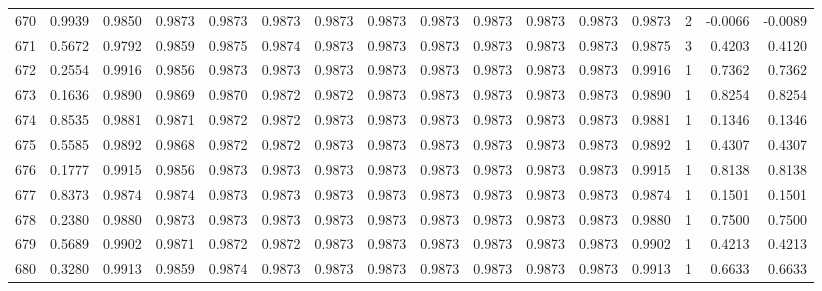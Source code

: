 \begin{tabular}{lrrrrrrrrrrrrrrr}
670 &      0.9939 &  0.9850 &  0.9873 &  0.9873 &  0.9873 &  0.9873 &  0.9873 &  0.9873 &  0.9873 &  0.9873 &   0.9873 &     0.9873 &      2 &                   -0.0066 &                    -0.0089 \\
671 &      0.5672 &  0.9792 &  0.9859 &  0.9875 &  0.9874 &  0.9873 &  0.9873 &  0.9873 &  0.9873 &  0.9873 &   0.9873 &     0.9875 &      3 &                    0.4203 &                     0.4120 \\
672 &      0.2554 &  0.9916 &  0.9856 &  0.9873 &  0.9873 &  0.9873 &  0.9873 &  0.9873 &  0.9873 &  0.9873 &   0.9873 &     0.9916 &      1 &                    0.7362 &                     0.7362 \\
673 &      0.1636 &  0.9890 &  0.9869 &  0.9870 &  0.9872 &  0.9872 &  0.9873 &  0.9873 &  0.9873 &  0.9873 &   0.9873 &     0.9890 &      1 &                    0.8254 &                     0.8254 \\
674 &      0.8535 &  0.9881 &  0.9871 &  0.9872 &  0.9872 &  0.9873 &  0.9873 &  0.9873 &  0.9873 &  0.9873 &   0.9873 &     0.9881 &      1 &                    0.1346 &                     0.1346 \\
675 &      0.5585 &  0.9892 &  0.9868 &  0.9872 &  0.9872 &  0.9873 &  0.9873 &  0.9873 &  0.9873 &  0.9873 &   0.9873 &     0.9892 &      1 &                    0.4307 &                     0.4307 \\
676 &      0.1777 &  0.9915 &  0.9856 &  0.9873 &  0.9873 &  0.9873 &  0.9873 &  0.9873 &  0.9873 &  0.9873 &   0.9873 &     0.9915 &      1 &                    0.8138 &                     0.8138 \\
677 &      0.8373 &  0.9874 &  0.9874 &  0.9873 &  0.9873 &  0.9873 &  0.9873 &  0.9873 &  0.9873 &  0.9873 &   0.9873 &     0.9874 &      1 &                    0.1501 &                     0.1501 \\
678 &      0.2380 &  0.9880 &  0.9873 &  0.9873 &  0.9873 &  0.9873 &  0.9873 &  0.9873 &  0.9873 &  0.9873 &   0.9873 &     0.9880 &      1 &                    0.7500 &                     0.7500 \\
679 &      0.5689 &  0.9902 &  0.9871 &  0.9872 &  0.9872 &  0.9873 &  0.9873 &  0.9873 &  0.9873 &  0.9873 &   0.9873 &     0.9902 &      1 &                    0.4213 &                     0.4213 \\
680 &      0.3280 &  0.9913 &  0.9859 &  0.9874 &  0.9873 &  0.9873 &  0.9873 &  0.9873 &  0.9873 &  0.9873 &   0.9873 &     0.9913 &      1 &                    0.6633 &                     0.6633 \\

\end{tabular}
